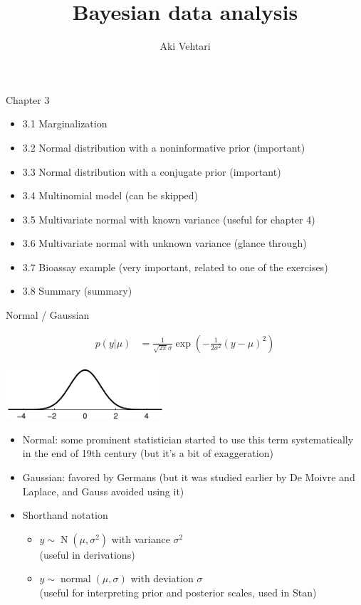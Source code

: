 \documentclass[finnish,english,t]{beamer}
\title[]{Bayesian data analysis}
\subtitle{}
\author{Aki Vehtari}
\institute[Aalto]{}
\DeclareMathOperator{\N}{N}
\DeclareMathOperator{\normal}{normal}
\begin{document}
\begin{frame}{Chapter 3}

  \begin{itemize}
\item 3.1 Marginalization
\item 3.2 Normal distribution with a noninformative prior (important)
\item 3.3 Normal distribution with a conjugate prior (important)
\item 3.4 Multinomial model (can be skipped)
\item 3.5 Multivariate normal with known variance (useful for chapter 4)
\item 3.6 Multivariate normal with unknown variance (glance through)
\item 3.7 Bioassay example (very important, related to one of the exercises)
\item 3.8 Summary (summary)
  \end{itemize}
\end{frame}

\begin{frame}{Normal / Gaussian}

    \vspace{-2\baselineskip}
    \begin{align*}
    p({y}|\mu)&=\frac{1}{\sqrt{2\pi}\sigma}\exp\left(-\frac{1}{2\sigma^2}({y}-\mu)^2\right)
    \end{align*}
    \vspace{-\baselineskip}
  \begin{center}
      \includegraphics[height=2cm,clip]{kuva2b_1}
  \end{center}
    \vspace{-\baselineskip}
  \begin{itemize}
  \item<2-> Normal: {\color{gray} some prominent statistician started
      to use this term systematically in the end of 19th century (but
      it's a bit of exaggeration)}
  \item<3-> Gaussian: {\color{gray}favored by Germans (but it was
      studied earlier by De Moivre and Laplace, and Gauss avoided
      using it)}
  \item<4-> Shorthand notation\\
    \begin{itemize}
    \item ${y} \sim \N(\mu,\sigma^2)$ with variance $\sigma^2$\\
      (useful in derivations)
    \item ${y} \sim \normal(\mu,\sigma)$ with deviation $\sigma$\\
      (useful for interpreting prior and posterior scales, used in
      Stan)
    \end{itemize}
  \end{itemize}
  
\end{frame}
\end{document}
